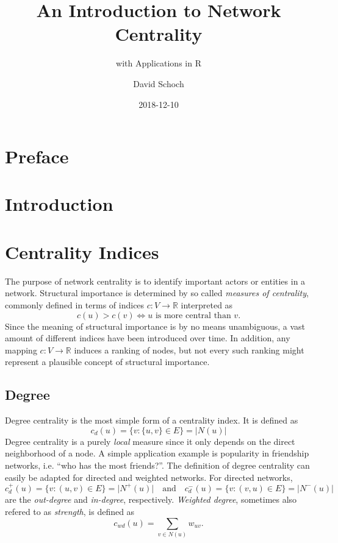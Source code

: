 \documentclass[]{book}
\title{An Introduction to Network Centrality}
\subtitle{with Applications in R}
\author{David Schoch}
\date{2018-12-10}
\theoremstyle{definition}
\theoremstyle{definition}
\theoremstyle{definition}
\theoremstyle{remark}
\begin{document}
\maketitle

{
\setcounter{tocdepth}{1}
\tableofcontents
}
\hypertarget{preface}{%
\chapter*{Preface}\label{preface}}

\hypertarget{intro}{%
\chapter{Introduction}\label{intro}}

\hypertarget{indices}{%
\chapter{Centrality Indices}\label{indices}}

The purpose of network centrality is to identify important actors or
entities in a network. Structural importance is determined by so called
\emph{measures of centrality}, commonly defined in terms of indices
\(c: V \to \mathbb{R}\) interpreted as \[
c(u) > c(v) \iff u \text{ is more central than } v.
\] Since the meaning of structural importance is by no means
unambiguous, a vast amount of different indices have been introduced
over time. In addition, any mapping \(c: V \to \mathbb{R}\) induces a
ranking of nodes, but not every such ranking might represent a plausible
concept of structural importance.

\hypertarget{degree}{%
\section{Degree}\label{degree}}

Degree centrality is the most simple form of a centrality index. It is
defined as \[
c_d(u) = \{v : \{u,v\} \in E\} = \lvert N(u) \rvert
\] Degree centrality is a purely \emph{local} measure since it only
depends on the direct neighborhood of a node. A simple application
example is popularity in friendship networks, i.e. ``who has the most
friends?''. The definition of degree centrality can easily be adapted
for directed and weighted networks. For directed networks, \[
c_d^+(u)=\{v : (u,v) \in E\} = \lvert N^+(u) \rvert \quad \text{and} \quad 
c_d^-(u)=\{v : (v,u) \in E\} = \lvert N^-(u) \rvert
\] are the \emph{out-degree} and \emph{in-degree}, respectively.
\emph{Weighted degree}, sometimes also refered to as \emph{strength}, is
defined as \[
c_{wd}(u)=\sum_{v \in N(u)} w_{uv}.
\]
\end{document}
